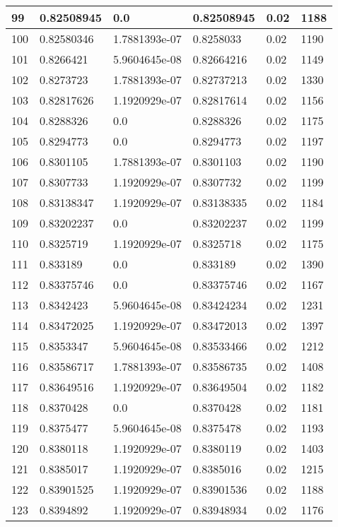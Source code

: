 \begin{longtable}{|l|l|l|l|l|l|}
99 & 0.82508945 & 0.0 & 0.82508945 & 0.02 & 1188 \\ \hline 
100 & 0.82580346 & 1.7881393e-07 & 0.8258033 & 0.02 & 1190 \\ \hline 
101 & 0.8266421 & 5.9604645e-08 & 0.82664216 & 0.02 & 1149 \\ \hline 
102 & 0.8273723 & 1.7881393e-07 & 0.82737213 & 0.02 & 1330 \\ \hline 
103 & 0.82817626 & 1.1920929e-07 & 0.82817614 & 0.02 & 1156 \\ \hline 
104 & 0.8288326 & 0.0 & 0.8288326 & 0.02 & 1175 \\ \hline 
105 & 0.8294773 & 0.0 & 0.8294773 & 0.02 & 1197 \\ \hline 
106 & 0.8301105 & 1.7881393e-07 & 0.8301103 & 0.02 & 1190 \\ \hline 
107 & 0.8307733 & 1.1920929e-07 & 0.8307732 & 0.02 & 1199 \\ \hline 
108 & 0.83138347 & 1.1920929e-07 & 0.83138335 & 0.02 & 1184 \\ \hline 
109 & 0.83202237 & 0.0 & 0.83202237 & 0.02 & 1199 \\ \hline 
110 & 0.8325719 & 1.1920929e-07 & 0.8325718 & 0.02 & 1175 \\ \hline 
111 & 0.833189 & 0.0 & 0.833189 & 0.02 & 1390 \\ \hline 
112 & 0.83375746 & 0.0 & 0.83375746 & 0.02 & 1167 \\ \hline 
113 & 0.8342423 & 5.9604645e-08 & 0.83424234 & 0.02 & 1231 \\ \hline 
114 & 0.83472025 & 1.1920929e-07 & 0.83472013 & 0.02 & 1397 \\ \hline 
115 & 0.8353347 & 5.9604645e-08 & 0.83533466 & 0.02 & 1212 \\ \hline 
116 & 0.83586717 & 1.7881393e-07 & 0.83586735 & 0.02 & 1408 \\ \hline 
117 & 0.83649516 & 1.1920929e-07 & 0.83649504 & 0.02 & 1182 \\ \hline 
118 & 0.8370428 & 0.0 & 0.8370428 & 0.02 & 1181 \\ \hline 
119 & 0.8375477 & 5.9604645e-08 & 0.8375478 & 0.02 & 1193 \\ \hline 
120 & 0.8380118 & 1.1920929e-07 & 0.8380119 & 0.02 & 1403 \\ \hline 
121 & 0.8385017 & 1.1920929e-07 & 0.8385016 & 0.02 & 1215 \\ \hline 
122 & 0.83901525 & 1.1920929e-07 & 0.83901536 & 0.02 & 1188 \\ \hline 
123 & 0.8394892 & 1.1920929e-07 & 0.83948934 & 0.02 & 1176 \\ \hline 

\end{longtable}

